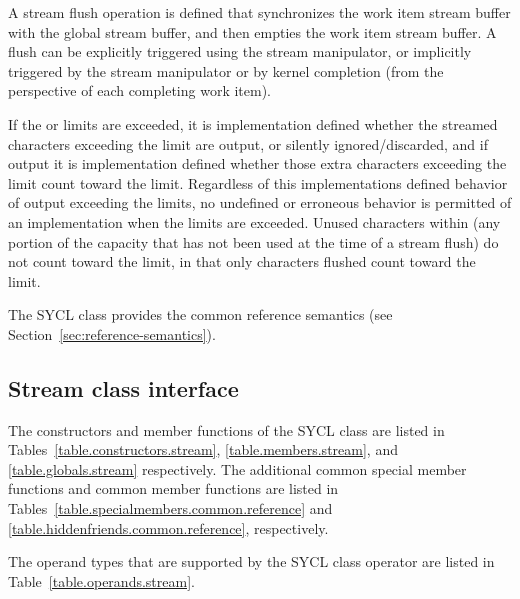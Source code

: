 A stream flush operation is defined that synchronizes the work item stream buffer with the global stream buffer, and then empties the work item stream buffer.  A flush can be explicitly triggered using the  stream manipulator, or implicitly triggered by the  stream manipulator or by kernel completion (from the perspective of each completing work item).

If the  or  limits are exceeded, it is implementation defined whether the streamed characters exceeding the limit are output, or silently ignored/discarded, and if output it is implementation defined whether those extra characters exceeding the  limit count toward the  limit.  Regardless of this implementations defined behavior of output exceeding the limits, no undefined or erroneous behavior is permitted of an implementation when the limits are exceeded.  Unused characters within  (any portion of the  capacity that has not been used at the time of a stream flush) do not count toward the  limit, in that only characters flushed count toward the  limit.

The SYCL  class provides the common reference semantics
(see Section~\ref{sec:reference-semantics}).

\subsection{Stream class interface}

The constructors and member functions of the SYCL  class are listed in Tables~\ref{table.constructors.stream}, \ref{table.members.stream}, and \ref{table.globals.stream} respectively. The additional common special member functions and common member functions are listed in Tables~\ref{table.specialmembers.common.reference} and \ref{table.hiddenfriends.common.reference}, respectively.

The operand types that are supported by the SYCL  class  operator are listed in Table~\ref{table.operands.stream}.

